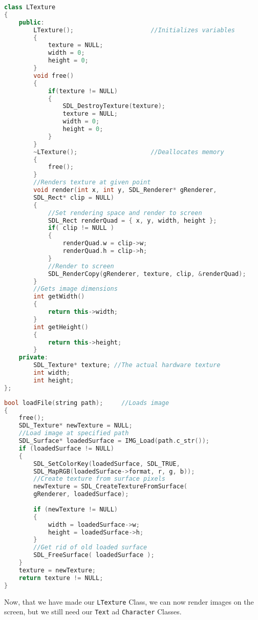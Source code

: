 \documentclass[11pt,fleqn]{book} %
\begin{document}
\begin{lstlisting}[language=C++, caption={Default, Overloaded and Copy Constructors}]
class LTexture
{
    public:
        LTexture();                     //Initializes variables
        {
            texture = NULL;
            width = 0;
            height = 0;
        }
        void free()
        {
            if(texture != NULL)
            {
                SDL_DestroyTexture(texture);
                texture = NULL;
                width = 0;
                height = 0;
            }
        }
        ~LTexture();                    //Deallocates memory
        {
            free();
        }
        //Renders texture at given point
        void render(int x, int y, SDL_Renderer* gRenderer,
        SDL_Rect* clip = NULL)
        {
            //Set rendering space and render to screen
            SDL_Rect renderQuad = { x, y, width, height };
            if( clip != NULL )
            {
                renderQuad.w = clip->w;
                renderQuad.h = clip->h;
            }
            //Render to screen
            SDL_RenderCopy(gRenderer, texture, clip, &renderQuad);
        }
        //Gets image dimensions
        int getWidth()
        {
            return this->width;
        }
        int getHeight()
        {
            return this->height;
        }
    private:
        SDL_Texture* texture; //The actual hardware texture
        int width;
        int height;
};
\end{lstlisting}

\begin{lstlisting}[language=C++, caption={Use of Array of Pointers and Destructors}]
bool loadFile(string path);     //Loads image
{
    free();
    SDL_Texture* newTexture = NULL;
    //Load image at specified path
    SDL_Surface* loadedSurface = IMG_Load(path.c_str());
    if (loadedSurface != NULL)
    {
        SDL_SetColorKey(loadedSurface, SDL_TRUE,
        SDL_MapRGB(loadedSurface->format, r, g, b));
        //Create texture from surface pixels
        newTexture = SDL_CreateTextureFromSurface( 
        gRenderer, loadedSurface);
        
        if (newTexture != NULL)
        {
            width = loadedSurface->w;
            height = loadedSurface->h;
        }
        //Get rid of old loaded surface
        SDL_FreeSurface( loadedSurface );
    }
    texture = newTexture;
    return texture != NULL;
}
\end{lstlisting}

Now, that we have made our \texttt{LTexture} Class, we can now render images on the screen, but we still need our \texttt{Text} ad \texttt{Character} Classes.
\end{document}
